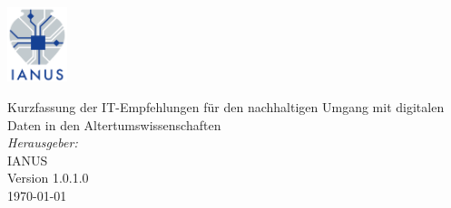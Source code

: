 \newcommand{\titel}[1]{{\LARGE \sffamily #1}}

\newcommand{\leadingzero}[1]{\ifnum #1<10 0\the#1\else\the#1\fi}

\newcommand{\datum}{\the\day.\the\month.\the\year}

\newcommand{\HRule}{\rule{\linewidth}{0.4mm}}

%
\thispagestyle{empty}
\begin{titlepage}

\begin{center}
\begin{flushleft}
\includegraphics[width=0.13\textwidth]{../deckblattLogos/ianus.png}\\[3cm]
\end{flushleft}
\titel{Kurzfassung der IT-Empfehlungen für den nachhaltigen Umgang mit digitalen Daten in den Altertumswissenschaften}\\[0.2cm]
\tib{\HRule \\[1.0cm]}
\large
\emph{Herausgeber:}\\
\textsc{IANUS}\\[1cm]
Version 1.0.1.0\\
{\large \today}
\end{center}


\end{titlepage}
